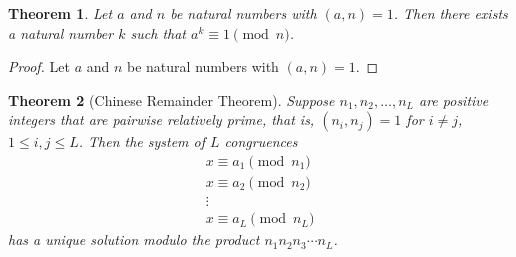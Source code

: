 \documentclass[12pt,leqno]{article}
\numberwithin{equation}{section}
\newtheorem{thm}{Theorem}[section]
\theoremstyle{definition}
\begin{document}

\begin{thm}
Let $a$ and $n$ be natural numbers with $(a, n) = 1$.  Then there
exists a natural number $k$ such that $a^k \equiv 1 \pmod{n}$.
\end{thm}
\begin{proof}[Proof]
Let $a$ and $n$ be natural numbers with $(a, n) = 1$.
\end{proof}

\pagebreak
\setcounter{section}{3}
\setcounter{thm}{28}

\begin{thm}[Chinese Remainder Theorem]
Suppose $n_1, n_2, \hdots, n_L$ are positive integers that are
pairwise relatively prime, that is, $(n_i, n_j)=1$ for $i\neq j$,
$1\leq i, j \leq L$.  Then the system of $L$ congruences
\[ \begin{array}{c}
x \equiv a_1 \pmod{n_1} \\
x \equiv a_2 \pmod{n_2} \\
\vdots \\
x \equiv a_L \pmod{n_L} \end{array} \] has a unique solution modulo
the product $n_1 n_2  n_3 \cdots n_L$.
\end{thm}
\end{document}
